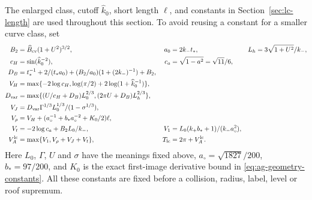 The enlarged class, cutoff $\widehat k_0$, short length $\ell$, and
constants in Section~\ref{sec:lc-length} are used throughout this
section.  To avoid reusing a constant for a smaller curve class, set
\begin{align}
 B_2&=\widehat B_{\rm cv}(1+U^2)^{3/2},&
 a_0&=2k_-t_*,&
 L_h&=3\sqrt{1+U^2}/k_-,\notag\\
 c_H&=\sin(\widehat k_0^{-2}),&
 c_a&=\sqrt{1-a^2}=\sqrt{11}/6,\notag\\
 D_B&=t_*^{-1}+2/(t_*a_0)
              +(B_2/a_0)(1+(2k_-)^{-1})+B_2,\notag\\
 V_H&=\max\{-2\log c_H,
             \log(\pi/2)+2\log(1+\widehat k_0^{-1})\},
                                                   \label{eq:lc-turn-one}\\
 D_{\rm var}&=\max\{(U/c_H+D_B)L_0^{2/3},
                         (2\pi U+D_B)L_h^{2/3}\},\notag\\
 V_J&=D_{\rm var}\Gamma^{1/3}L_0^{1/3}/(1-\sigma^{1/3}),\notag\\
 V_\rho&=V_H+(a_\circ^{-1}+b_*a_\circ^{-2}+K_0/2)\ell,\notag\\
 V_t&=-2\log c_a+B_2L_0/k_-,&
 V_1&=L_0(k_+b_*+1)/(k_-a_\circ^2),\notag\\
 V_A^{\rm lc}&=\max\{V_1,V_\rho+V_J+V_t\},&
 T_{\rm lc}&=2\pi+V_A^{\rm lc}.
                                                   \label{eq:lc-turn-two}
\end{align}
Here $L_0$, $\Gamma$, $U$ and $\sigma$ have the meanings fixed above,
$a_\circ=\sqrt{1827}/200$, $b_*=97/200$, and $K_0$ is the exact
first-image derivative bound in \eqref{eq:ag-geometry-constants}.
All these constants are fixed before a collision, radius, label, level
or roof supremum.


